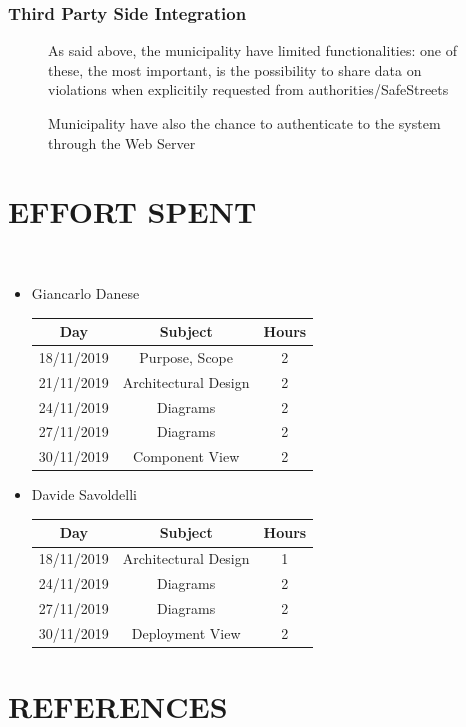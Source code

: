 \documentclass[12pt,a4paper]{article}
\begin{document}
\subsubsection{Third Party Side Integration}
\begin{figure}[H]
		\centering

		\caption{As said above, the municipality have limited functionalities: one of these, the most important, is the possibility to share data on violations when explicitily requested from authorities/SafeStreets}
\end{figure}
\begin{figure}[H]
		\centering

		\caption{Municipality have also the chance to authenticate to the system through the Web Server}
\end{figure}
\section{EFFORT SPENT}	\
\begin{itemize}
		\item Giancarlo Danese
		\begin{center}
			\begin{tabular}{| c | c | c |}
				\hline
				Day & Subject & Hours \\ \hline
				18/11/2019 & Purpose, Scope & 2 \\
				21/11/2019 & Architectural Design & 2\\
				24/11/2019 & Diagrams & 2\\
				27/11/2019 & Diagrams & 2\\
				30/11/2019 & Component View & 2\\
				\hline
			\end{tabular}
		\end{center}

		\item Davide Savoldelli
		\begin{center}
			\begin{tabular}{| c | c | c |}
				\hline
				Day & Subject & Hours \\ \hline
				18/11/2019 & Architectural Design & 1 \\
				24/11/2019 & Diagrams & 2 \\
				27/11/2019 & Diagrams & 2 \\
				30/11/2019 & Deployment View & 2\\
				\hline
			\end{tabular}
		\end{center}
	\end{itemize}
\section{REFERENCES}
\end{document}
